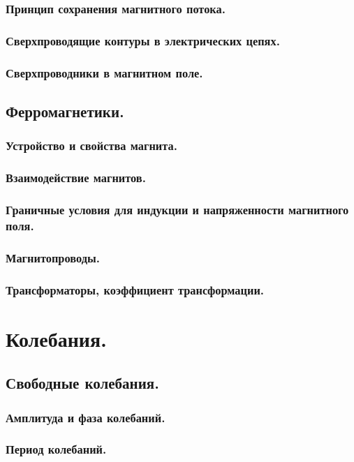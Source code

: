 \documentclass{article}
\begin{document}
        \subsubsection{Принцип сохранения магнитного потока.}
        \subsubsection{Сверхпроводящие контуры в электрических цепях.}
        \subsubsection{Сверхпроводники в магнитном поле.}
    \subsection{Ферромагнетики.}
        \subsubsection{Устройство и свойства магнита.}
        \subsubsection{Взаимодействие магнитов.}
        \subsubsection{Граничные условия для индукции и напряженности магнитного поля.}
        \subsubsection{Магнитопроводы.}
        \subsubsection{Трансформаторы, коэффициент трансформации.}
\section{Колебания.}
    \subsection{Свободные колебания.}
        \subsubsection{Амплитуда и фаза колебаний.}
        \subsubsection{Период колебаний.}
\end{document}
